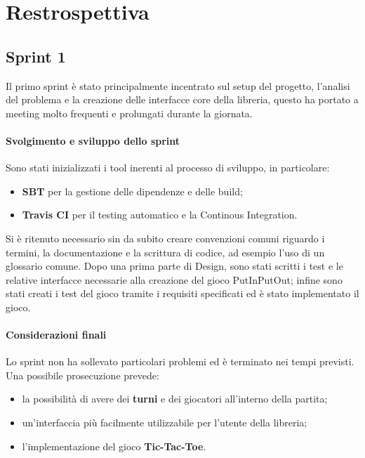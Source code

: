 \section{Restrospettiva}



\subsection{Sprint 1}
Il primo sprint è stato principalmente incentrato sul setup del progetto, l'analisi del problema e la creazione delle interfacce core della libreria, questo ha portato a meeting molto frequenti e prolungati durante la giornata.
\paragraph{Svolgimento e sviluppo dello sprint}
Sono stati inizializzati i tool inerenti al processo di sviluppo, in particolare:
\begin{itemize}
   \item \textbf{SBT} per la gestione delle dipendenze e delle build;
   \item \textbf{Travis CI} per il testing automatico e la Continous Integration.
\end{itemize}
Si è ritenuto necessario sin da subito creare convenzioni comuni riguardo i termini, la documentazione e la scrittura di codice, ad esempio l'uso di un glossario comune.
%
Dopo una prima parte di Design, sono stati scritti i test e le relative interfacce necessarie alla creazione del gioco PutInPutOut; infine sono stati creati i test del gioco tramite i requisiti specificati ed è stato implementato il gioco.
\paragraph{Considerazioni finali}
Lo sprint non ha sollevato particolari problemi ed è terminato nei tempi previsti.
%
Una possibile prosecuzione prevede:
\begin{itemize}
  \item la possibilità di avere dei \textbf{turni} e dei giocatori all'interno della partita;
  \item un'interfaccia più facilmente utilizzabile per l'utente della libreria;
  \item l'implementazione del gioco \textbf{Tic-Tac-Toe}.
\end{itemize} 